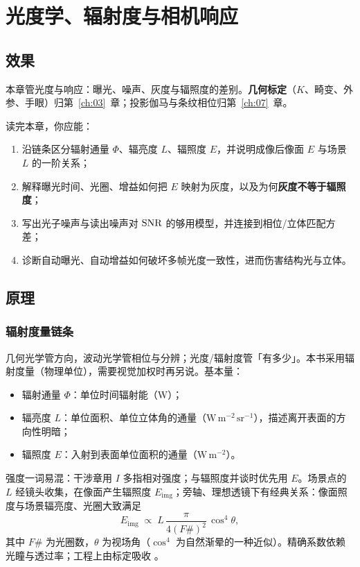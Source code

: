 \chapter{光度学、辐射度与相机响应}
\label{ch:06}

\section{效果}

本章管光度与响应：曝光、噪声、灰度与辐照度的差别。\textbf{几何标定}（$K$、畸变、外参、手眼）归第~\ref{ch:03}~章；投影伽马与条纹相位归第~\ref{ch:07}~章。
\label{sec:ch05-effect}

读完本章，你应能：
\begin{enumerate}
  \item 沿链条区分辐射通量 $\Phi$、辐亮度 $L$、辐照度 $E$，并说明成像后像面 $E$ 与场景 $L$ 的一阶关系；
  \item 解释曝光时间、光圈、增益如何把 $E$ 映射为灰度，以及为何\textbf{灰度不等于辐照度}；
  \item 写出光子噪声与读出噪声对 $\mathrm{SNR}$ 的够用模型，并连接到相位/立体匹配方差；
  \item 诊断自动曝光、自动增益如何破坏多帧光度一致性，进而伤害结构光与立体。
\end{enumerate}

\section{原理}
\label{sec:ch05-principle}

\subsection{辐射度量链条}

几何光学管方向，波动光学管相位与分辨；光度/辐射度管「有多少」。本书采用辐射度量（物理单位），需要视觉加权时再另说。基本量：
\begin{itemize}
  \item 辐射通量 $\Phi$：单位时间辐射能（W）；
  \item 辐亮度 $L$：单位面积、单位立体角的通量（$\mathrm{W\,m^{-2}\,sr^{-1}}$），描述离开表面的方向性明暗；
  \item 辐照度 $E$：入射到表面单位面积的通量（$\mathrm{W\,m^{-2}}$）。
\end{itemize}
强度一词易混：干涉章用 $I$ 多指相对强度；与辐照度并谈时优先用 $E$。场景点的 $L$ 经镜头收集，在像面产生辐照度 $E_{\mathrm{img}}$；旁轴、理想透镜下有经典关系：像面照度与场景辐亮度、光圈大致满足
\begin{equation}
  E_{\mathrm{img}} \;\propto\; L\,\frac{\pi}{4(F\#)^{2}}\,\cos^{4}\theta,
  \label{eq:ch06-image-irr}
\end{equation}
其中 $F\#$ 为光圈数，$\theta$ 为视场角（$\cos^{4}$ 为自然渐晕的一种近似）。精确系数依赖光瞳与透过率；工程上由标定吸收 \citep{HechtOptics,Horn1986RobotVision}。

